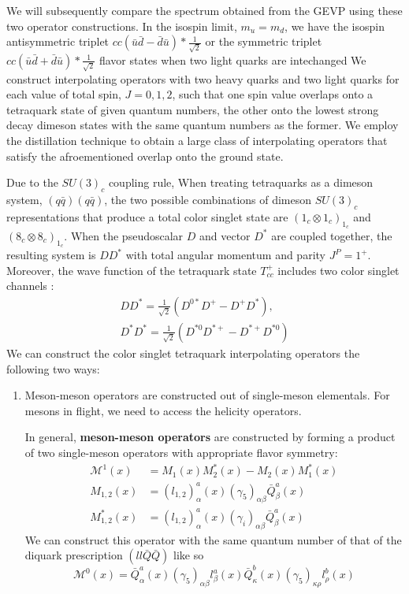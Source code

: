 \begin{table}
We will subsequently compare the spectrum obtained from the GEVP using these two operator constructions. 
In the isospin limit, $m_u = m_d$, we have the isospin antisymmetric triplet $cc(\bar{u}\bar{d} - \bar{d}\bar{u}) * \frac{1}{\sqrt{2}}$ or the symmetric triplet $cc(\bar{u}\bar{d} + \bar{d}\bar{u}) * \frac{1}{\sqrt{2}}$  flavor states when two light quarks are intechanged \cite{Ortiz-Pacheco:2023ble} We construct interpolating operators with two heavy quarks and two light quarks for each value of total spin, $J=0,1,2$, such that one spin value overlaps onto a tetraquark state of given quantum numbers, the other onto the lowest strong decay dimeson states with the same quantum numbers as the former. We employ the distillation technique to obtain a large class of interpolating operators that satisfy the afroementioned overlap onto the ground state. 

Due to the $SU(3)_c$ coupling rule, When treating tetraquarks as a dimeson system, $(q\bar{q})(q\bar{q})$, the two possible combinations of dimeson $SU(3)_c$ representations that produce a total color singlet state are $({1_c \otimes 1_c})_{1_c}$ and $({8_c \otimes 8_c})_{1_c}$. When the pseudoscalar $D$ and vector $D^*$ are coupled together, the resulting system is $DD^*$ with total angular momentum and parity $J^P = 1^+$. Moreover, the wave function of the tetraquark state $T_{cc}^+$ includes two color singlet channels :
\begin{align}
    DD^* = \frac{1}{\sqrt{2}}(D^{0*}D^+ - D^+D^*), \\
    D^*D^* = \frac{1}{\sqrt{2}}(D^{*0}D^{*+} - D^{*+}D^{*0})
\end{align} 
We can construct the color singlet tetraquark interpolating operators the following two ways:
\begin{enumerate}
    \item Meson-meson operators are constructed out of single-meson elementals. For mesons in flight, we need to access the helicity operators.  

    In general, \textbf{meson-meson operators} are constructed by forming a product of two single-meson operators with appropriate flavor symmetry: \cite{Junnarkar_2019}
    \begin{align}
    \mathcal{M}^1(x) &= M_1(x)M_2^*(x) - M_2(x)M_1^*(x) \\
    M_{1,2}(x) &= (l_{1,2})^a_\alpha(x) (\gamma_5)_{\alpha\beta} \bar{Q}^a_\beta(x) \\
    M_{1,2}^*(x) &= (l_{1,2})^a_\alpha(x) (\gamma_i)_{\alpha\beta} \bar{Q}^a_\beta(x) 
    \end{align}
    We can construct this operator with the same quantum number of that of the diquark prescription $(ll\bar{Q}\bar{Q})$ like so 
    \begin{equation}
    \mathcal{M}^0(x) = \bar{Q}_\alpha^a(x)(\gamma_5)_{\alpha\beta}l^a_\beta(x) \bar{Q}_\kappa^b(x)(\gamma_5)_{\kappa\rho}l^b_\rho(x)
    \end{equation}


\end{enumerate}
\end{table}
